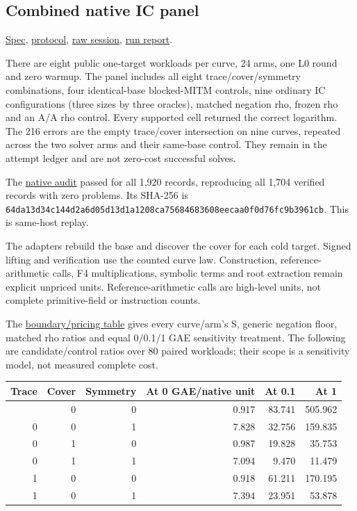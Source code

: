 \documentclass[
  10pt,
]{article}
\begin{document}
\subsection{Combined native IC panel}\label{combined-native-ic-panel}

\href{../E15_SPEC_V1.json}{Spec},
\href{../PIPELINE_PROTOCOL_V1.md}{protocol},
\href{../execution-v1/runs/ecbench-20261022T0012Z/}{raw session},
\href{execution-20261022T0032Z/ecbench-20261022T0012Z/REPORT.pdf}{run
report}.

There are eight public one-target workloads per curve, 24 arms, one L0
round and zero warmup. The panel includes all eight trace/cover/symmetry
combinations, four identical-base blocked-MITM controls, nine ordinary
IC configurations (three sizes by three oracles), matched negation rho,
frozen rho and an A/A rho control. Every supported cell returned the
correct logarithm. The 216 errors are the empty trace/cover intersection
on nine curves, repeated across the two solver arms and their same-base
control. They remain in the attempt ledger and are not zero-cost
successful solves.

The \href{../execution-v1/logs/E15-audit-v1.json}{native audit} passed
for all 1,920 records, reproducing all 1,704 verified records with zero
problems. Its SHA-256 is
\texttt{64da13d34c144d2a6d05d13d1a1208ca75684683608eecaa0f0d76fc9b3961cb}.
This is same-host replay.

The adapters rebuild the base and discover the cover for each cold
target. Signed lifting and verification use the counted curve law.
Construction, reference-arithmetic calls, F4 multiplications, symbolic
terms and root extraction remain explicit unpriced units.
Reference-arithmetic calls are high-level units, not complete
primitive-field or instruction counts.

The
\href{execution-20261022T0032Z/ecbench-20261022T0012Z/BOUNDARY_PRICING.csv}{boundary/pricing
table} gives every curve/arm's S, generic negation floor, matched rho
ratios and equal 0/0.1/1 GAE sensitivity treatment. The following are
candidate/control ratios over 80 paired workloads; their scope is a
sensitivity model, not measured complete cost.

\begin{longtable}[]{@{}rrrrrr@{}}
\toprule\noalign{}
Trace & Cover & Symmetry & At 0 GAE/native unit & At 0.1 & At 1 \\
\midrule\noalign{}
\endhead
\bottomrule\noalign{}
\endlastfoot
0 & 0 & 0 & 0.917 & 83.741 & 505.962 \\
0 & 0 & 1 & 7.828 & 32.756 & 159.835 \\
0 & 1 & 0 & 0.987 & 19.828 & 35.753 \\
0 & 1 & 1 & 7.094 & 9.470 & 11.479 \\
1 & 0 & 0 & 0.918 & 61.211 & 170.195 \\
1 & 0 & 1 & 7.394 & 23.951 & 53.878 \\
\end{longtable}
\end{document}
